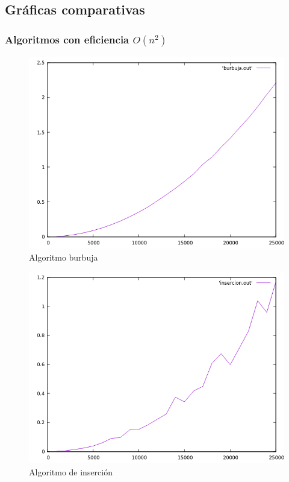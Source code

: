 \documentclass[12pt,spanish]{article}
\begin{document}
\subsection{Gráficas comparativas}

\subsubsection{Algoritmos con eficiencia $O(n^2)$}
\begin{figure}[H]
\centering
\includegraphics[scale=0.75]{empirica_burbuja.png}
\caption{Algoritmo burbuja}
\end{figure}

\begin{figure}[H]
\centering
\includegraphics[scale=0.75]{empirica_insercion.png}
\caption{Algoritmo de inserción}
\end{figure}
\end{document}
